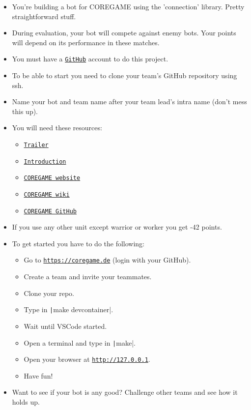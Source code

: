 \documentclass[12pt]{article}
\begin{document}
\begin{itemize}
  \item You're building a bot for COREGAME using the 'connection' library. Pretty straightforward stuff.

  \item During evaluation, your bot will compete against enemy bots. Your points will depend on its performance in these matches.

  \item You must have a \href{https://github.com}{\texttt{GitHub}} account to do this project.

  \item To be able to start you need to clone your team's GitHub repository using ssh.

  \item Name your bot and team name after your team lead's intra name (don't mess this up).

  \item You will need these resources:
  \begin{itemize}
    \item \href{https://youtu.be/gMmBgHnb8Nc?si=Thm0HOCfNIZbfCnI}{\texttt{Trailer}}
    \item \href{https://shattereddisk.github.io/rickroll/rickroll.mp4}{\texttt{Introduction}}
    \item \href{https://coregame.de}{\texttt{COREGAME website}}
    \item \href{https://42core-team.github.io/rush02-wiki/#/}{\texttt{COREGAME wiki}}
    \item \href{https://github.com/42core-team}{\texttt{COREGAME GitHub}}
  \end{itemize}

  \item If you use any other unit except warrior or worker you get -42 points.

  \newpage

  \item To get started you have to do the following:
  \begin{itemize}
    \item Go to \href{https://coregame.de}{\texttt{https://coregame.de}} (login with your GitHub).
    \item Create a team and invite your teammates.
    \item Clone your repo.
    \item Type in \texttt|make devcontainer|.
    \item Wait until VSCode started.
    \item Open a terminal and type in \texttt|make|.
    \item Open your browser at \href{http://127.0.0.1}{\texttt{http://127.0.0.1}}.
    \item Have fun!
  \end{itemize}

  \item Want to see if your bot is any good? Challenge other teams and see how it holds up.
\end{itemize}
\end{document}
